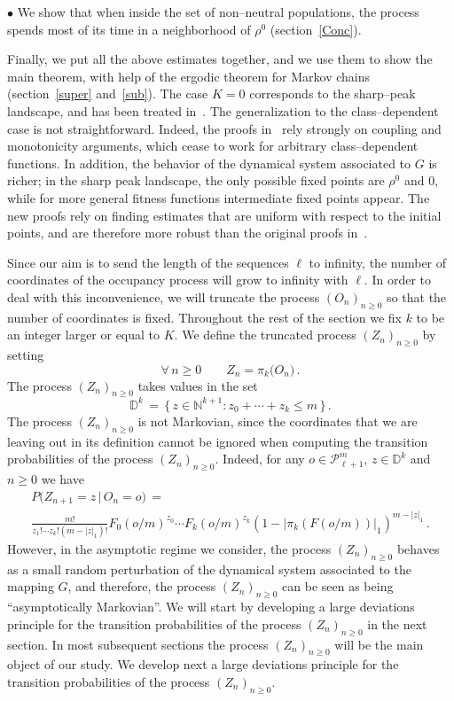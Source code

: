 \documentclass[a4paper,12pt]{article}
\theoremstyle{definition}
\theoremstyle{remark}
\def \cP {\mathcal{P}}
\def \dD {\mathbb{D}}
\def \N {\mathbb{N}}
\def \Ot {(O_n)_{n\geq 0}}
\def \Zt {(Z_n)_{n\geq 0}}
\def \pml {\cP^m_{\ell +1}}
\begin{document}
$\bullet$ We show that when inside the set of non--neutral populations,
the process spends most of its time in a neighborhood of $\rho^0$ (section~\ref{Conc}).

Finally, we put all the above estimates together, and
we use them to show the main theorem, with help of the ergodic 
theorem for Markov chains (section~\ref{super} and~\ref{sub}).
The case $K=0$ corresponds to the sharp--peak landscape,
and has been treated in~\cite{CerfWF,DWF}.
The generalization to the class--dependent case is not straightforward.
Indeed, the proofs in~\cite{CerfWF,DWF} rely strongly on 
coupling and monotonicity arguments, which cease to work for arbitrary 
class--dependent functions. In addition, the behavior of 
the dynamical system associated to $G$ is richer;
in the sharp peak landscape, the only possible fixed points 
are $\rho^0$ and $0$, while for more general fitness functions
intermediate fixed points appear.
The new proofs rely on finding estimates that are uniform 
with respect to the initial points, and are therefore more robust
than the original proofs in~\cite{CerfWF,DWF}.

Since
our aim is to send the length of the sequences $\ell$ to infinity,
the number of coordinates of the occupancy process
will grow to infinity with $\ell$. In order to deal with this
inconvenience, we will truncate the process $\Ot$ so that
the number of coordinates is fixed.
Throughout the rest of the section we fix $k$ 
to be an integer larger or equal to $K$.
We define the truncated
process
$\Zt$ by setting
$$\forall\, n\geq 0\qquad
Z_n=\pi_k\big(
O_n
\big)\,.$$
The process $\Zt$ takes values in the set 
$$\dD^k\,=\,\big\lbrace\,
z\in\N^{k+1}:z_0+\cdots+z_k\leq m
\,\big\rbrace\,.$$
The process $\Zt$ is not Markovian, since the coordinates that 
we are leaving out in its definition cannot be ignored when computing
the transition probabilities of the process $\Zt$. Indeed, for any 
$o\in\pml$, $z\in\dD^k$ and $n\geq0$ we have
\begin{multline*}
P\big(
Z_{n+1}=z\,\big|\,O_n=o
\big)\,=\\
\frac{m!}{z_1!\cdots z_k!(m-|z|_1)!}
F_0(o/m)^{z_0}\cdots
F_k(o/m)^{z_k}(1-|\pi_k(F(o/m))|_1)^{m-|z|_1}\,.
\end{multline*}
However, in the asymptotic regime we consider, 
the process $\Zt$ behaves as a small random perturbation of the dynamical system
associated to the mapping $G$, and therefore,
the process $\Zt$ can be seen as being ``asymptotically Markovian''.
We will start by developing a large deviations principle for the transition probabilities 
of the process $\Zt$ in the next section.
In most subsequent sections the process $\Zt$ will be the main
object of our study.
We develop next a large deviations principle for the transition 
probabilities of the process $\Zt$.
\end{document}
